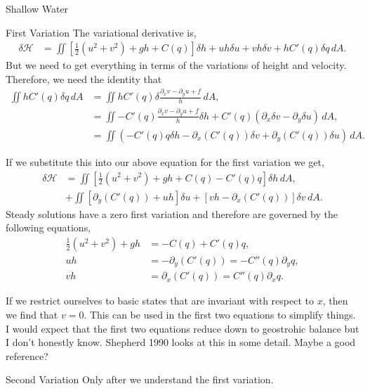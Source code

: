 \documentclass[12pt]{article}
\begin{document}
\begin{section}{Shallow Water}
    \begin{subsection}{First Variation}
        The variational derivative is,
        \begin{align*}
            \delta \mathcal{H}
            &=  \iint \left[ \frac12  (u^2 + v^2) + g h  + C(q) \right] \delta h   +  uh  \delta u + vh \delta v   + h C'(q) \delta q \, dA.
        \end{align*}
        But we need to get everything in terms of the variations of height and velocity.  Therefore, we need the identity that
        \begin{align*}
            \iint h C'(q) \delta q \, dA
            &= \iint h C'(q) \delta \frac{ \partial_x v - \partial_y u+ f}{h} \, dA, \\
            &= \iint - C'(q) \frac{ \partial_x v - \partial_y u+ f}{h } \delta h + C'(q) \left(  \partial_x \delta v - \partial_y \delta u \right) \, dA, \\
            &= \iint \left( - C'(q) q \delta h - \partial_x ( C'(q) )  \delta v + \partial_y ( C'(q) ) \delta u \right) \, dA.
        \end{align*}

        If we substitute this into our above equation for the first variation we get,
        \begin{align*}
            \delta \mathcal{H}
            & =  \iint \left[ \frac12  (u^2 + v^2) + g h  + C(q)  - C'(q) q\right] \delta h     \, dA, \\
            & +  \iint \left[ \partial_y ( C'(q) ) + u h \right] \delta u  +  \left[ vh - \partial_x ( C'(q) )  \right] \delta v \, dA.
        \end{align*}
        Steady solutions have a zero first variation and therefore are governed by the following equations,
        \begin{align*}
            \frac12  (u^2 + v^2) + g h & = - C(q)  + C'(q) q ,\\
            u h & = - \partial_y ( C'(q) ) = - C''(q) \partial_y q, \\
            vh  & = \partial_x ( C'(q) ) = C''(q) \partial_x q.
        \end{align*}

        If we restrict ourselves to basic states that are invariant with respect to $x$, then we find that $v= 0$.  This can be used in the first two equations to simplify things.  I would expect that the first two equations reduce down to geostrohic balance but I don't honestly know.  Shepherd 1990 looks at this in some detail.  Maybe a good reference?
    \end{subsection}

    \begin{subsection}{Second Variation}
        Only after we understand the first variation.
    \end{subsection}
\end{section}
\end{document}
